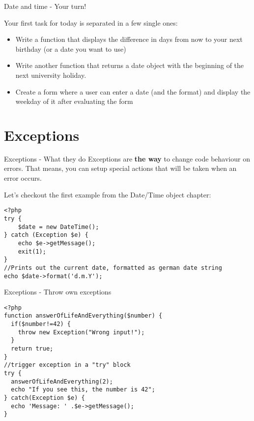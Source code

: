 \begin{frame}[fragile]{Date and time - Your turn!}

Your first task for today is separated in a few single ones:

\begin{itemize}
\item Write a function that displays the difference in days from now to your next birthday (or a date you want to use) \pause
\item Write another function that returns a date object with the beginning of the next university holiday. \pause
\item Create a form where a user can enter a date (and the format) and display the weekday of it after evaluating the form
\end{itemize}

\end{frame}

\section{Exceptions}

\begin{frame}[fragile]{Exceptions - What they do}
Exceptions are \textbf{the way} to change code behaviour on errors. That means, you can setup special actions that will be taken when an error occurs. \pause

Let's checkout the first example from the Date/Time object chapter:

\begin{lstlisting}
<?php
try {
    $date = new DateTime();
} catch (Exception $e) {
    echo $e->getMessage();
    exit(1);
}
//Prints out the current date, formatted as german date string
echo $date->format('d.m.Y');
\end{lstlisting}

\end{frame}

\begin{frame}[fragile]{Exceptions - Throw own exceptions}

\begin{lstlisting}
<?php
function answerOfLifeAndEverything($number) {
  if($number!=42) {
    throw new Exception("Wrong input!");
  }
  return true;
}
//trigger exception in a "try" block
try {
  answerOfLifeAndEverything(2);
  echo "If you see this, the number is 42";
} catch(Exception $e) {
  echo 'Message: ' .$e->getMessage();
}
\end{lstlisting}

\end{frame}


